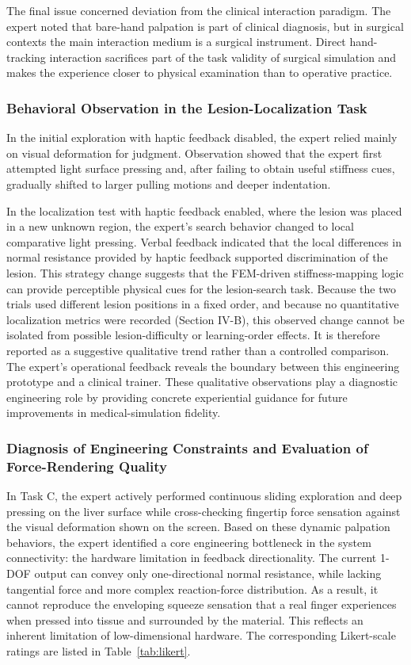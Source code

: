 \documentclass{ieeeaccess}
\begin{document}
The final issue concerned deviation from the clinical interaction paradigm. The expert noted that bare-hand palpation is part of clinical diagnosis, but in surgical contexts the main interaction medium is a surgical instrument. Direct hand-tracking interaction sacrifices part of the task validity of surgical simulation and makes the experience closer to physical examination than to operative practice.

\subsubsection{Behavioral Observation in the Lesion-Localization Task}
In the initial exploration with haptic feedback disabled, the expert relied mainly on visual deformation for judgment. Observation showed that the expert first attempted light surface pressing and, after failing to obtain useful stiffness cues, gradually shifted to larger pulling motions and deeper indentation.

In the localization test with haptic feedback enabled, where the lesion was placed in a new unknown region, the expert's search behavior changed to local comparative light pressing. Verbal feedback indicated that the local differences in normal resistance provided by haptic feedback supported discrimination of the lesion. This strategy change suggests that the FEM-driven stiffness-mapping logic can provide perceptible physical cues for the lesion-search task. Because the two trials used different lesion positions in a fixed order, and because no quantitative localization metrics were recorded (Section IV-B), this observed change cannot be isolated from possible lesion-difficulty or learning-order effects. It is therefore reported as a suggestive qualitative trend rather than a controlled comparison.
The expert's operational feedback reveals the boundary between this engineering prototype and a clinical trainer. These qualitative observations play a diagnostic engineering role by providing concrete experiential guidance for future improvements in medical-simulation fidelity.

\subsubsection{Diagnosis of Engineering Constraints and Evaluation of Force-Rendering Quality}
In Task C, the expert actively performed continuous sliding exploration and deep pressing on the liver surface while cross-checking fingertip force sensation against the visual deformation shown on the screen. Based on these dynamic palpation behaviors, the expert identified a core engineering bottleneck in the system connectivity: the hardware limitation in feedback directionality. The current 1-DOF output can convey only one-directional normal resistance, while lacking tangential force and more complex reaction-force distribution. As a result, it cannot reproduce the enveloping squeeze sensation that a real finger experiences when pressed into tissue and surrounded by the material. This reflects an inherent limitation of low-dimensional hardware. The corresponding Likert-scale ratings are listed in Table~\ref{tab:likert}.
\end{document}
